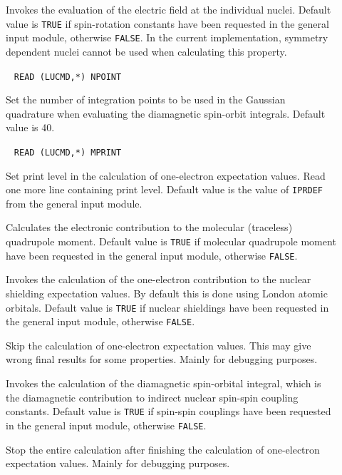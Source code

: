 \begin{description}
\item[] Invokes the evaluation of the electric
field at the individual nuclei. Default
value is \verb|TRUE| if 
spin-rotation constants have been
requested in the general input 
module, otherwise \verb|FALSE|. In the current implementation,
symmetry dependent nuclei cannot be used when calculating this property.

\item[]\verb| |\newline
\verb|READ (LUCMD,*) NPOINT|

Set the number of integration points to be used in the Gaussian
quadrature
when evaluating  the diamagnetic spin-orbit integrals. Default value is 40.

\item[]\verb| |\newline
\verb|READ (LUCMD,*) MPRINT|

Set print level in the calculation of one-electron expectation values.
Read one more line containing print level. Default value is the
value of \verb|IPRDEF| from the general input module.

\item[] Calculates the electronic contribution to the
molecular (traceless) quadrupole moment. Default value is \verb|TRUE| 
if molecular quadrupole moment have been requested in the general input
module, otherwise \verb|FALSE|.

\item[] Invokes the calculation of the one-electron
contribution to the nuclear shielding
expectation values. By default 
this is done using London atomic
orbitals. Default value is 
\verb|TRUE| if nuclear shieldings have been requested in the general
input module, otherwise \verb|FALSE|.

\item[] Skip the calculation of one-electron expectation
values. This may give wrong final results for some properties. Mainly
for debugging purposes.

\item[] Invokes the calculation of the diamagnetic
spin-orbital integral, which is the
diamagnetic contribution to 
indirect nuclear spin-spin coupling
constants. Default value is 
\verb|TRUE| if spin-spin couplings have been requested in the general
input module, otherwise \verb|FALSE|.

\item[] Stop the entire calculation after finishing the
calculation of one-electron expectation values. Mainly for debugging
purposes.

\end{description}

